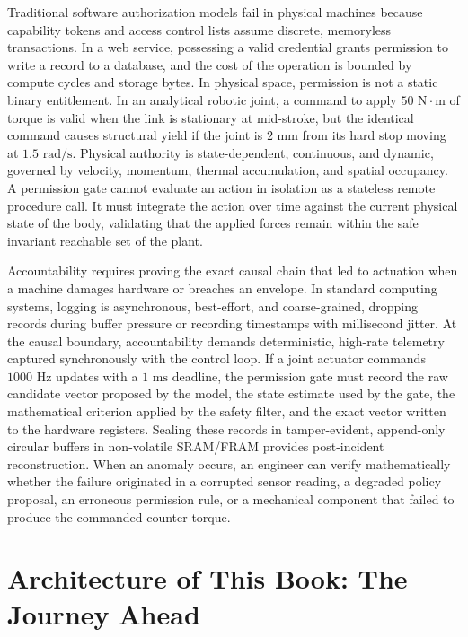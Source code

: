 \documentclass[
  10pt,
  letterpaper,
  twoside,
  openright,
  numbers=noenddot,
  headings=standardclasses
]{scrbook}
\begin{document}
Traditional software authorization models fail in physical machines
because capability tokens and access control lists assume discrete,
memoryless transactions. In a web service, possessing a valid credential
grants permission to write a record to a database, and the cost of the
operation is bounded by compute cycles and storage bytes. In physical
space, permission is not a static binary entitlement. In an analytical
robotic joint, a command to apply \(50\text{ N}\cdot\text{m}\) of torque
is valid when the link is stationary at mid-stroke, but the identical
command causes structural yield if the joint is \(2\text{ mm}\) from its
hard stop moving at \(1.5\text{ rad/s}\). Physical authority is
state-dependent, continuous, and dynamic, governed by velocity,
momentum, thermal accumulation, and spatial occupancy. A permission gate
cannot evaluate an action in isolation as a stateless remote procedure
call. It must integrate the action over time against the current
physical state of the body, validating that the applied forces remain
within the safe invariant reachable set of the plant.

Accountability requires proving the exact causal chain that led to
actuation when a machine damages hardware or breaches an envelope. In
standard computing systems, logging is asynchronous, best-effort, and
coarse-grained, dropping records during buffer pressure or recording
timestamps with millisecond jitter. At the causal boundary,
accountability demands deterministic, high-rate telemetry captured
synchronously with the control loop. If a joint actuator commands
\(1000\text{ Hz}\) updates with a \(1\text{ ms}\) deadline, the
permission gate must record the raw candidate vector proposed by the
model, the state estimate used by the gate, the mathematical criterion
applied by the safety filter, and the exact vector written to the
hardware registers. Sealing these records in tamper-evident, append-only
circular buffers in non-volatile SRAM/FRAM provides post-incident
reconstruction. When an anomaly occurs, an engineer can verify
mathematically whether the failure originated in a corrupted sensor
reading, a degraded policy proposal, an erroneous permission rule, or a
mechanical component that failed to produce the commanded
counter-torque.

\section{Architecture of This Book: The Journey
Ahead}\label{sec-boundary-1-10}
\end{document}
